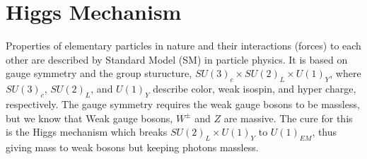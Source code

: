 \section{Higgs Mechanism}

Properties of elementary particles in nature and their interactions (forces)
to each other are described by Standard Model (SM) in particle physics. It is 
based on gauge symmetry and the group sturucture, 
$SU(3)_c \times SU(2)_L \times U(1)_Y$, where  $SU(3)_c$, $SU(2)_L$, and $U(1)_Y$  
describe color, weak isospin, and hyper charge, respectively. 
The gauge symmetry requires the weak gauge bosons to be massless,
but we know that Weak gauge bosons, $W^\pm$ and $Z$ are massive. 
The cure for this is the Higgs mechanism which breaks $SU(2)_L \times U(1)_Y$
to $U(1)_{EM}$, thus giving mass to weak bosons but keeping photons massless. 

